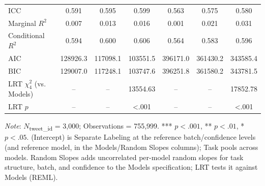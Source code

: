 \documentclass{article}
\begin{document}
\begin{table}
{\begin{tabular}{lcccccc}
ICC & 0.591 & 0.595 & 0.599 & 0.563 & 0.575 & 0.580 \\
Marginal $R^2$ & 0.007 & 0.013 & 0.016 & 0.001 & 0.021 & 0.031 \\
Conditional $R^2$ & 0.594 & 0.600 & 0.606 & 0.564 & 0.583 & 0.596 \\
AIC & 128926.3 & 117098.1 & 103551.5 & 396171.0 & 361430.2 & 343585.4 \\
BIC & 129007.0 & 117248.1 & 103747.6 & 396251.8 & 361580.2 & 343781.5 \\
LRT $\chi^2_{4}$ (vs. Models) & -- & -- & 13554.63 & -- & -- & 17852.78 \\
LRT $p$ & -- & -- & <.001 & -- & -- & <.001 \\
\bottomrule
\end{tabular}%
}
\smallskip
\begin{minipage}{\textwidth}
\raggedright
\footnotesize \textit{Note}: $N$\textsubscript{tweet\_id} = 3,000; Observations = 755,999. *** $p<.001$, ** $p<.01$, * $p<.05$. (Intercept) is Separate Labeling at the reference batch/confidence levels (and reference model, in the Models/Random Slopes columns); Task pools across models. Random Slopes adds uncorrelated per-model random slopes for task structure, batch, and confidence to the Models specification; LRT tests it against Models (REML).
\end{minipage}
\end{table}
\end{document}
